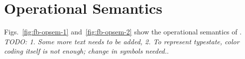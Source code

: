 %
%
\section{Operational Semantics}


Figs.~\ref{fig:fb-opsem-1} and~\ref{fig:fb-opsem-2} show the
operational semantics of \fbname. \emph{TODO: 1. Some more text needs
to be added, 2. To represent typestate, color coding itself is not
enough; change in symbols needed.}.






